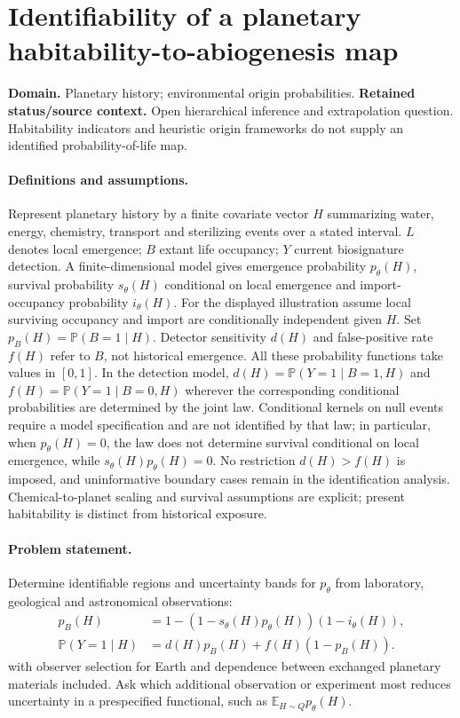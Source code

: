 \documentclass[11pt]{article}
\begin{document}
\section*{Identifiability of a planetary habitability-to-abiogenesis map}
\label{prob:299}
\label{rank:49}
\par\smallskip

\noindent\textbf{Domain.} Planetary history; environmental origin probabilities. \quad \textbf{Retained status/source context.} Open hierarchical inference and extrapolation question. Habitability indicators and heuristic origin frameworks do not supply an identified probability-of-life map.

\paragraph{Definitions and assumptions.} Represent planetary history by a finite covariate vector $H$ summarizing water, energy, chemistry, transport and sterilizing events over a stated interval. $L$ denotes local emergence; $B$ extant life occupancy; $Y$ current biosignature detection. A finite-dimensional model gives emergence probability $p_\theta(H)$, survival probability $s_\theta(H)$ conditional on local emergence and import-occupancy probability $i_\theta(H)$. For the displayed illustration assume local surviving occupancy and import are conditionally independent given $H$. Set $p_B(H)=\mathbb{P}(B=1\mid H)$. Detector sensitivity $d(H)$ and false-positive rate $f(H)$ refer to $B$, not historical emergence. All these probability functions take values in $[0,1]$. In the detection model, $d(H)=\mathbb{P}(Y=1\mid B=1,H)$ and $f(H)=\mathbb{P}(Y=1\mid B=0,H)$ wherever the corresponding conditional probabilities are determined by the joint law. Conditional kernels on null events require a model specification and are not identified by that law; in particular, when $p_\theta(H)=0$, the law does not determine survival conditional on local emergence, while $s_\theta(H)p_\theta(H)=0$. No restriction $d(H)>f(H)$ is imposed, and uninformative boundary cases remain in the identification analysis. Chemical-to-planet scaling and survival assumptions are explicit; present habitability is distinct from historical exposure.

\paragraph{Problem statement.} Determine identifiable regions and uncertainty bands for $p_\theta$ from laboratory, geological and astronomical observations:
\[
\begin{aligned}
p_B(H)&=1-(1-s_\theta(H)p_\theta(H))(1-i_\theta(H)),\\
\mathbb{P}(Y=1\mid H)&=d(H)p_B(H)+f(H)(1-p_B(H)).
\end{aligned}
\]
with observer selection for Earth and dependence between exchanged planetary materials included. Ask which additional observation or experiment most reduces uncertainty in a prespecified functional, such as $\mathbb{E}_{H\sim Q}p_\theta(H)$.
\end{document}
